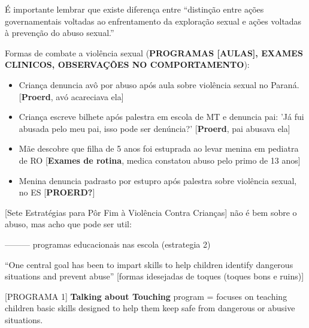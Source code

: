 É importante lembrar que existe diferença entre ``distinção entre ações governamentais voltadas ao enfrentamento da exploração sexual e ações voltadas à prevenção do abuso sexual.''  \cite{caccia2014conselheiros}

Formas de combate a violência sexual (\textbf{PROGRAMAS [AULAS], EXAMES CLINICOS, OBSERVAÇÕES NO COMPORTAMENTO}):

\begin{itemize}
  \item Criança denuncia avô por abuso após aula sobre violência sexual no Paraná. \cite{central2019crianca} [\textbf{Proerd}, avó acareciava ela]
  \item Criança escreve bilhete após palestra em escola de MT e denuncia pai: 'Já fui abusada pelo meu pai, isso pode ser denúncia?' \cite{lidiane2018crianca} [\textbf{Proerd}, pai abusava ela]
  \item Mãe descobre que filha de 5 anos foi estuprada ao levar menina em pediatra de RO \cite{jonatas2018crianca} [\textbf{Exames de rotina}, medica constatou abuso pelo primo de 13 anos]
  \item Menina denuncia padrasto por estupro após palestra sobre violência sexual, no ES [\textbf{PROERD?}]
\end{itemize}








[Sete Estratégias para Pôr Fim à Violência Contra Crianças] não é bem sobre o abuso, mas acho que pode ser util: %




--------- programas educacionais nas escola (estrategia 2)


``One central goal has been to impart skills to help children identify dangerous situations and prevent abuse'' \cite{finkelhor2009prevention} [formas idesejadas de toques (toques bons e ruins)]

[PROGRAMA 1] \textbf{Talking about Touching} program =  focuses on teaching children basic skills designed to help them keep safe from dangerous or abusive situations. \cite{finkelhor2009prevention} %

